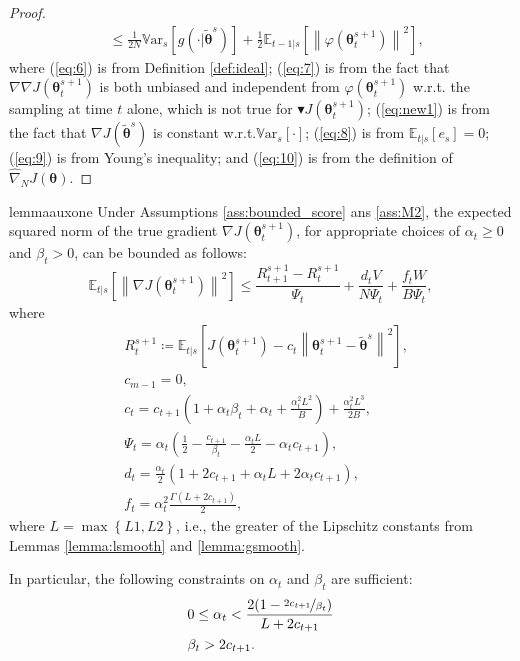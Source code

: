 \documentclass{article}
\makeatletter
\theoremstyle{remark}
\theoremstyle{definition}
\DeclareRobustCommand{\ie}{i.e.,\@\xspace}
\DeclareRobustCommand{\wrt}{w.r.t.\@\xspace}
\newcommand{\norm}[2][\infty]{\left\|#2\right\|_{#1}}
\newcommand{\dnabla}{\nabla\!\!\!\!\nabla}
\newcommand{\vtheta}{\boldsymbol{\theta}}
\newcommand{\gradJ}[1]{\nabla J(#1)}
\newcommand{\gradApp}[2]{\widehat{\nabla}_{#2}J(#1)}
\newcommand{\Ets}[2][t]{\mathbb{E}_{#1\vert s}\left[#2\right]}
\newcommand{\Vars}[1]{{\mathbb{V}\text{ar}}_{s}\left[#1\right]}
\newcommand{\gradBlack}[1]{\blacktriangledown J(#1)}
\newcommand{\gradIdeal}[1]{\dnabla J(#1)}
\makeatother
\begin{document}
\begin{proof}
\begin{align}
	&\leq
	\frac{1}{2N}\Vars{g(\cdot\vert\tilde{\vtheta}^s)} +\frac{1}{2}\Ets[t-1]{\norm[]{\varphi(\vtheta_t^{s+1})}^2},
	\nonumber
\end{align}
where (\ref{eq:6}) is from Definition \ref{def:ideal}; (\ref{eq:7}) is from the fact that $\gradIdeal{\vtheta_t^{s+1}}$ is both unbiased and independent from $\varphi(\vtheta_t^{s+1})$ \wrt the sampling at time $t$ alone, which is not true for $\gradBlack{\vtheta_t^{s+1}}$; 
(\ref{eq:new1}) is from the fact that $\gradJ{\tilde{\vtheta}^s}$ is constant \wrt $\Vars{\cdot}$;
(\ref{eq:8}) is from $\Ets{e_s}=0$; (\ref{eq:9}) is from Young's inequality; and (\ref{eq:10}) is from the definition of $\gradApp{\vtheta}{N}$.
\end{proof}

\begin{restatable}[]{lemma}{auxone}\label{lemma:aux1}
Under Assumptions \ref{ass:bounded_score} ans \ref{ass:M2}, the expected squared norm of the true gradient $\gradJ{\vtheta_t^{s+1}}$, for appropriate choices of $\alpha_t\geq0$ and $\beta_t>0$, can be bounded as follows:
\[
	\Ets{\norm[]{\gradJ{\vtheta_t^{s+1}}}^2} \leq
	\frac{R_{t+1}^{s+1} - R_t^{s+1}}{\Psi_t} + \frac{d_tV}{N\Psi_t}
	+\frac{f_tW}{B\Psi_t},
\]
	where
\begin{align*}
	&R_t^{s+1}\coloneqq \Ets{J(\vtheta_t^{s+1}) - c_t\norm[]{\vtheta_t^{s+1}-\tilde{\vtheta}^s}^2}, \\
	&c_{m-1} = 0, \\
	&c_t = c_{t+1}\left(1+\alpha_t\beta_t+\alpha_t+\frac{\alpha_t^2L^2}{B}\right)+\frac{\alpha_t^2L^3}{2B}, \\
	&\Psi_t = \alpha_t\left(\frac{1}{2}-\frac{c_{t+1}}{\beta_t}-\frac{\alpha_tL}{2}-\alpha_tc_{t+1}\right), \\
	&d_t = \frac{\alpha_t}{2}\left(1+2c_{t+1}+\alpha_tL+2\alpha_tc_{t+1}\right), \\
	&f_t = \alpha_t^2\frac{\Gamma(L+2c_{t+1})}{2},
\end{align*}
where $L=\max\left\{L1,L2\right\}$, \ie the greater of the Lipschitz constants from Lemmas \ref{lemma:lsmooth} and \ref{lemma:gsmooth}.

In particular, the following constraints on $\alpha_t$ and $\beta_t$ are sufficient:
\begin{align*}
&0\leq\alpha_t < \frac{2(1-\nicefrac{2c_{t+1}}{\beta_t})}{L+2c_{t+1}} \\
&\beta_t > 2c_{t+1}.
\end{align*}
\end{restatable}
\end{document}

